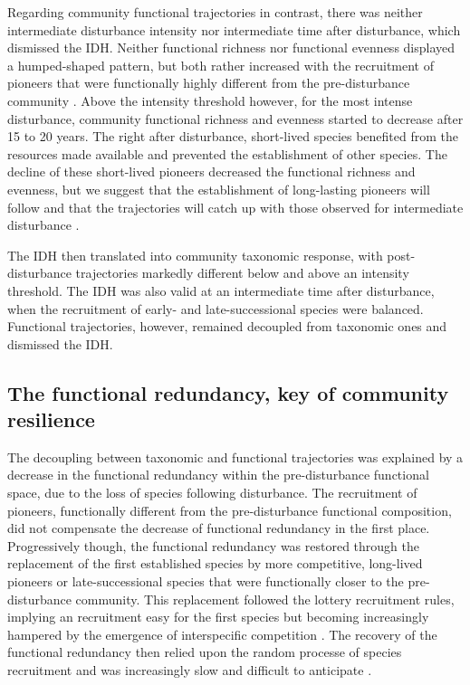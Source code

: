 \documentclass[fleqn,10pt]{ArtEcoFoG} %
\begin{document}
Regarding community functional trajectories in contrast, there was
neither intermediate disturbance intensity nor intermediate time after
disturbance, which dismissed the IDH. Neither functional richness nor
functional evenness displayed a humped-shaped pattern, but both rather
increased with the recruitment of pioneers that were functionally highly
different from the pre-disturbance community
\citep{Denslow1980, Molino2001}. Above the intensity threshold however,
for the most intense disturbance, community functional richness and
evenness started to decrease after 15 to 20 years. The right after
disturbance, short-lived species benefited from the resources made
available and prevented the establishment of other species. The decline
of these short-lived pioneers decreased the functional richness and
evenness, but we suggest that the establishment of long-lasting pioneers
will follow and that the trajectories will catch up with those observed
for intermediate disturbance \citep{Walker2009}.

The IDH then translated into community taxonomic response, with
post-disturbance trajectories markedly different below and above an
intensity threshold. The IDH was also valid at an intermediate time
after disturbance, when the recruitment of early- and late-successional
species were balanced. Functional trajectories, however, remained
decoupled from taxonomic ones and dismissed the IDH.

\subsection{The functional redundancy, key of community
resilience}\label{the-functional-redundancy-key-of-community-resilience}

The decoupling between taxonomic and functional trajectories was
explained by a decrease in the functional redundancy within the
pre-disturbance functional space, due to the loss of species following
disturbance. The recruitment of pioneers, functionally different from
the pre-disturbance functional composition, did not compensate the
decrease of functional redundancy in the first place. Progressively
though, the functional redundancy was restored through the replacement
of the first established species by more competitive, long-lived
pioneers or late-successional species that were functionally closer to
the pre-disturbance community. This replacement followed the lottery
recruitment rules, implying an recruitment easy for the first species
but becoming increasingly hampered by the emergence of interspecific
competition \citep{Busing2002}. The recovery of the functional
redundancy then relied upon the random processe of species recruitment
and was increasingly slow and difficult to anticipate
\citep{Elmqvist2003, Diaz2005}.
\end{document}
